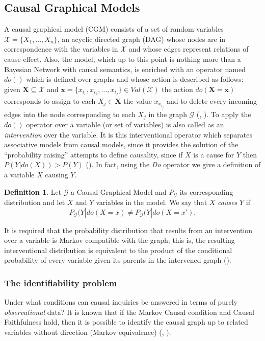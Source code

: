 \documentclass[english,letterpaper,12pt,final]{article}
\theoremstyle{definition}
\newtheorem{defi}{Definition}[section]
\begin{document}
	\subsection{Causal Graphical Models}
	A causal graphical model (CGM) consists of a set of random variables $\mathcal{X}=\{ X_1,...,X_n \}$, an acyclic directed graph (DAG) whose nodes are in correspondence with the variables in $\mathcal{X}$ and whose edges represent relations of cause-effect. Also, the model, which up to this point is nothing more than a Bayesian Network with causal semantics, is enriched with an operator named $do()$ which is defined over graphs and whose action is described as follows: given $\mathbf{X} \subseteq \mathcal{X}$ and $\mathbf{x} = \{ x_{i_1}, x_{i_2}, ... , x_{i_j} \} \in Val(\mathcal{X})$ the action $do(\mathbf{X} = \mathbf{x} )$ corresponds to assign to each $X_j \in \mathbf{X}$ the value $x_{x_{i_j}}$ and to delete every incoming edges into the node corresponding to each $X_j$ in the graph $\mathcal{G}$ (\cite{koller2009probabilistic}, \cite{sucar2015probabilistic}). To apply the $do()$ operator over a variable (or set of variables) is also called as an \textit{intervention} over the variable. It is this interventional operator which separates associative models from causal models, since it provides the solution of the “probability raising” attempts to define causality, since if $X$ is a cause for $Y$ then $P(Y | do(X)) > P(Y)$ (\cite{pearl2018why}). In fact, using the \textit{Do} operator we give a definition of a variable $X$ causing $Y$.
	\begin{defi}
	Let $\mathcal{G}$ a Causal Graphical Model and $P_\mathcal{G}$ its corresponding distribution and let $X$ and $Y$ variables in the model. We say that $X$ \textit{causes} $Y$ if 
	\[ P_\mathcal{G}(Y | do(X=x) \neq P_\mathcal{G}(Y | do(X=x'). \]
	\end{defi}
	
	It is required that the probability distribution that results from an intervention over a variable is Markov compatible with the graph; this is, the resulting interventional distribution is equivalent to the product of the conditional probability of every variable given its parents in the intervened graph (\cite{sucar2015probabilistic}).
	\subsubsection{The identifiability problem}
	Under what conditions can causal inquiries be answered in terms of purely \textit{observational} data? It is known that if the Markov Causal condition and Causal Faithfulness hold, then it is possible to identify the causal graph up to related variables without direction (Markov equivalence) (\cite{peters2012identifiability}, \cite{mooij2016distinguishing}).
\end{document}
